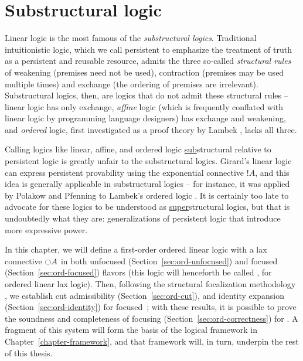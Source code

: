 \chapter{Substructural logic}
\label{chapter-order}

Linear logic is the most famous of the {\it substructural logics}.
Traditional intuitionistic logic, which we call persistent to emphasize
the treatment of truth as a persistent and reusable resource, admits
the three so-called {\it structural rules} of weakening (premises need
not be used), contraction (premises may be used multiple times) and
exchange (the ordering of premises are irrelevant). Substructural
logics, then, are logics that do not admit these structural rules --
linear logic has only exchange, {\it affine} logic (which is
frequently conflated with linear logic by programming language
designers) has exchange and weakening, and {\it ordered} logic, first
investigated as a proof theory by Lambek \cite{lambek58mathematics},
lacks all three.

Calling logics like
linear, affine, and ordered logic \underline{sub}structural relative
to persistent logic is greatly unfair to the
substructural logics. Girard's linear logic can express persistent
provability using the exponential connective ${!}A$, and this idea is
generally applicable in substructural logics -- for instance, it was
applied by Polakow and Pfenning to Lambek's ordered logic
\cite{polakow99natural}. It is certainly too
late to advocate for these logics to be understood as
\underline{super}structural logics, but that is undoubtedly what they
are: generalizations of persistent logic that introduce more 
expressive power. 

In this chapter, we will define a first-order ordered linear logic
with a lax connective ${\ocircle}A$ in both unfocused
(Section~\ref{sec:ord-unfocused}) and focused
(Section~\ref{sec:ord-focused}) flavors (this logic will henceforth be
called \ollll, for ordered linear lax logic). Then, following the
structural focalization methodology \cite{simmons11structural}, we
establish cut admissibility (Section~\ref{sec:ord-cut}), and identity
expansion (Section~\ref{sec:ord-identity}) for focused~\ollll; with
these results, it is possible to prove the soundness and completeness
of focusing (Section~\ref{sec:ord-correctness}) for \ollll.  A
fragment of this system will form the basis of the logical framework
in Chapter~\ref{chapter-framework}, and that framework will, in turn,
underpin the rest of this thesis.

